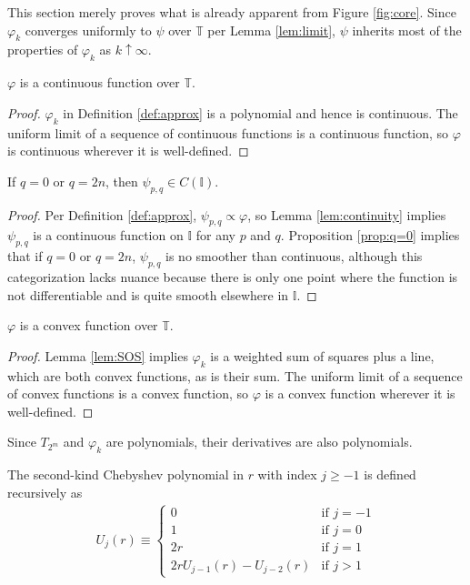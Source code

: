 This section merely proves what is already apparent from Figure \ref{fig:core}. Since $\varphi_k$ converges uniformly to $\psi$ over $\mathbb{T}$ per Lemma \ref{lem:limit}, $\psi$ inherits most of the properties of $\varphi_k$ as $k \uparrow \infty$.
\begin{lemma}
  \label{lem:continuity}
  $\varphi$ is a continuous function over $\mathbb{T}$.
\end{lemma}
\begin{proof}
  $\varphi_k$ in Definition \ref{def:approx} is a polynomial and hence is continuous. The uniform limit of a sequence of continuous functions is a continuous function, so $\varphi$ is continuous wherever it is well-defined.
\end{proof}

\begin{lemma}
  \label{lem:end_continuity}
  If $q = 0$ or $q = 2n$, then $\psi_{p,q} \in C\left(\mathbb{I}\right)$.
\end{lemma}
\begin{proof}
  Per Definition \ref{def:approx}, $\psi_{p,q} \propto \varphi$, so Lemma \ref{lem:continuity} implies $\psi_{p,q}$ is a continuous function on $\mathbb{I}$ for any $p$ and $q$. Proposition \ref{prop:q=0} implies that if $q = 0$ or $q = 2n$, $\psi_{p,q}$ is no smoother than continuous, although this categorization lacks nuance because there is only one point where the function is not differentiable and is quite smooth elsewhere in $\mathbb{I}$.
\end{proof}

\begin{lemma}
  \label{lem:convexity}
  $\varphi$ is a convex function over $\mathbb{T}$.
\end{lemma}
  
\begin{proof}
  Lemma \ref{lem:SOS} implies $\varphi_k$ is a weighted sum of squares plus a line, which are both convex functions, as is their sum. The uniform limit of a sequence of convex functions is a convex function, so $\varphi$ is a convex function wherever it is well-defined.
\end{proof}

Since $T_{2^m}$ and $\varphi_k$ are polynomials, their derivatives are also polynomials.
\begin{definition}
  \label{def:U}
  \leanok
  The second-kind Chebyshev polynomial in $r$ with index $j \geq -1$ is defined recursively as
  \begin{align*}
U_j\left(r\right) \equiv 
\begin{cases}
0 & \text{if } j = -1 \\
1 & \text{if } j = 0 \\
2r & \text{if } j = 1 \\
2 r U_{j - 1}\left(r\right) - U_{j - 2}\left(r\right) & \text{if } j > 1
\end{cases}
  \end{align*}
\end{definition}

